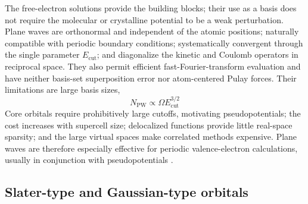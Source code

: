 \documentclass[11pt,a4paper,titlepage]{article}
\numberwithin{equation}{section}
\begin{document}
The free-electron solutions provide the building blocks; their use as a
basis does not require the molecular or crystalline potential to be a weak
perturbation. Plane waves are orthonormal and independent of
the atomic positions; naturally compatible with periodic boundary conditions;
systematically convergent through the single parameter $E_\text{cut}$; and
diagonalize the kinetic and Coulomb operators in reciprocal space. They also
permit efficient fast-Fourier-transform evaluation and have neither basis-set
superposition error nor atom-centered Pulay forces. Their limitations are
large basis sizes,
\begin{equation}
  N_\text{PW}\propto\Omega E_\text{cut}^{3/2}
\end{equation}
Core orbitals require prohibitively large cutoffs, motivating
pseudopotentials; the cost increases with supercell size; delocalized functions
provide little real-space sparsity; and the large virtual spaces make
correlated methods expensive.
Plane waves are therefore especially effective for periodic valence-electron
calculations, usually in conjunction with pseudopotentials \citep{Payne1992}.

\subsection{Slater-type and Gaussian-type orbitals}
\end{document}
